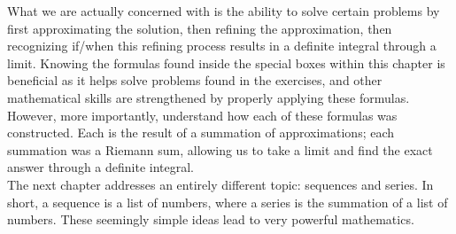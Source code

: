 What we are actually concerned with is the ability to solve certain problems by first approximating the solution, then refining the approximation, then recognizing if/when this refining process results in a definite integral through a limit. Knowing the formulas found inside the special boxes within this chapter is beneficial as it helps solve problems found in the exercises, and other mathematical skills are strengthened by properly applying these formulas. However, more importantly, understand how each of these formulas was constructed. Each is the result of a summation of approximations; each summation was a Riemann sum, allowing us to take a limit and find the exact answer through a definite integral. \\

The next chapter addresses an entirely different topic: sequences and series. In short, a sequence is a list of numbers, where a series is the summation of a list of numbers. These seemingly simple ideas lead to very powerful mathematics.

